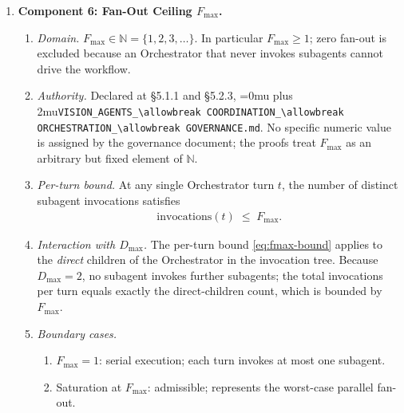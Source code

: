 \documentclass[12pt]{article}
\theoremstyle{definition}
\DeclareRobustCommand{\code}[1]{\begingroup\Urlmuskip=0mu plus 2mu\relax\nolinkurl{#1}\endgroup}
\newcommand{\VisionGov}{\code{VISION\_AGENTS\_\allowbreak COORDINATION\_\allowbreak ORCHESTRATION\_\allowbreak GOVERNANCE.md}}
\begin{document}
\begin{enumerate}
  \item \textbf{Component 6: Fan-Out Ceiling $F_{\max}$.}
  \begin{enumerate}
    \item[6.1] \emph{Domain.}
               $F_{\max} \in \mathbb{N} = \{1,2,3,\ldots\}$.
               In particular $F_{\max} \geq 1$; zero fan-out is
               excluded because an Orchestrator that never invokes
               subagents cannot drive the workflow.
    \item[6.2] \emph{Authority.}
               Declared at \S5.1.1 and \S5.2.3,
               \VisionGov{}.
               No specific numeric value is assigned by the governance
               document; the proofs treat $F_{\max}$ as an arbitrary
               but fixed element of $\mathbb{N}$.
    \item[6.3] \emph{Per-turn bound.}
               At any single Orchestrator turn $t$, the number of
               distinct subagent invocations satisfies
               \begin{align}
                 \mathrm{invocations}(t) \;\leq\; F_{\max}.
                 \label{eq:fmax-bound}
               \end{align}
    \item[6.4] \emph{Interaction with $D_{\max}$.}
               The per-turn bound \eqref{eq:fmax-bound} applies to
               the \emph{direct} children of the Orchestrator in the
               invocation tree.  Because $D_{\max} = 2$, no subagent
               invokes further subagents; the total invocations per
               turn equals exactly the direct-children count, which is
               bounded by $F_{\max}$.
    \item[6.5] \emph{Boundary cases.}
               \begin{enumerate}
                 \item[(a)] $F_{\max} = 1$: serial execution; each
                            turn invokes at most one subagent.
                 \item[(b)] Saturation at $F_{\max}$: admissible;
                            represents the worst-case parallel
                            fan-out.
               \end{enumerate}
  \end{enumerate}


\end{enumerate}
\end{document}
